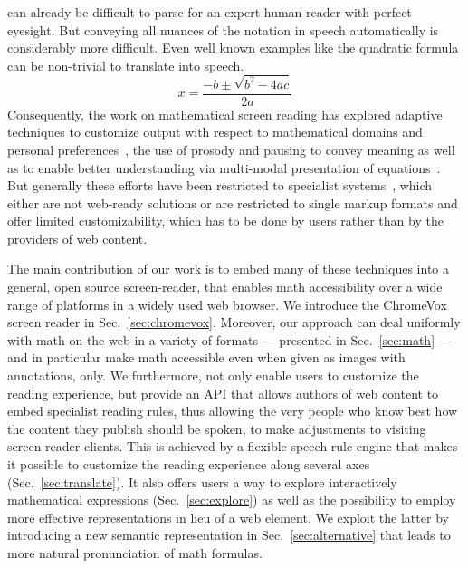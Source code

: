 \documentclass{sig-alternate}
\begin{document}
\noindent can already be difficult to parse for an expert human reader with
perfect eyesight. But conveying all nuances of the notation in speech
automatically is considerably more difficult. Even well known examples
like the quadratic formula can be non-trivial to translate into speech.
\begin{equation}
  \label{eq:quadratic}
  x=\frac{-b \pm \sqrt {b^2-4ac}}{2a}
\end{equation}
\EndAccSupp{}
Consequently, the work on mathematical screen reading has explored adaptive
techniques to customize output with respect to mathematical domains and personal
preferences~\cite{raman1994aster,DBLP:conf/hci/DoushP09}, the use of prosody and
pausing to convey meaning \cite{raman1994aster,Bates:2010:SMU:1880751.1880821}
as well as to enable better understanding via multi-modal presentation of
equations~\cite{conf/icchp/GillanBKP04}.  But generally these efforts have been
restricted to specialist
systems~\cite{raman1994aster,soiffer2005mathplayer,chen2006clc,yamaguchi2008new},
which either are not web-ready solutions or are restricted to single markup
formats and offer limited customizability, which has to be done by users rather
than by the providers of web content.

The main contribution of our work is to embed many of these techniques into a
general,  open source screen-reader, that enables math
accessibility over a wide range of platforms in a widely used web browser. We
introduce the ChromeVox screen reader in Sec.~\ref{sec:chromevox}. Moreover, our
approach can deal uniformly with math on the web in a variety of formats ---
presented in Sec.~\ref{sec:math} --- and in particular make math accessible even
when given as images with annotations, only. We furthermore, not only enable
users to customize the reading experience, but provide an API that allows
authors of web content to embed specialist reading rules, thus allowing the very
people who know best how the content they publish should be spoken, to make
adjustments to visiting screen reader clients.  This is achieved by a flexible
speech rule engine that makes it possible to customize the reading experience
along several axes (Sec.~\ref{sec:translate}). It also offers users a way to
explore interactively mathematical expressions (Sec.~\ref{sec:explore}) as well
as the possibility to employ more effective representations in lieu of a web
element. We exploit the latter by introducing a new semantic representation in
Sec.~\ref{sec:alternative} that leads to more natural pronunciation of math
formulas.
\end{document}
